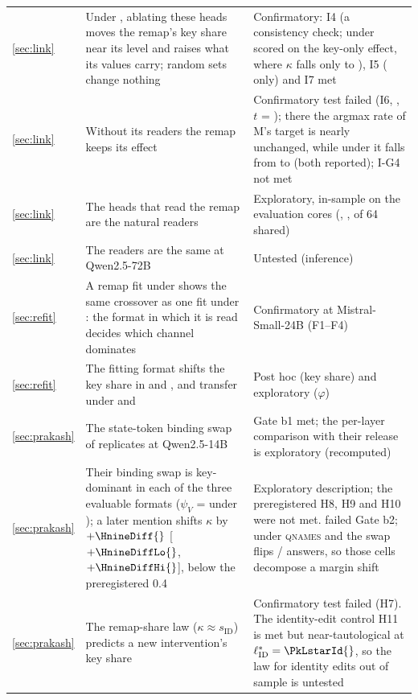 \begin{table}[p]
\begin{tabular}{p{}p{}p{}}
\cref{sec:link} & Under \fmtOpt{}, ablating these heads moves the remap's key share near its \fmtNone{} level and raises what its values carry; random sets change nothing & Confirmatory: I4 (a consistency check; under \fmtLetter{} scored on the key-only effect, where $\kappa$ falls only to \IfourKappaALetter{}), I5 (\fmtOpt{} only) and I7 met \\
\cref{sec:link} & Without its readers the remap keeps its effect & Confirmatory test failed (I6, \fmtOpt{}, $t$ = \IsixT{}); there the argmax rate of M's target is nearly unchanged, while under \fmtLetter{} it falls from \IsixMTLetter{} to \IsixMTALetter{} (both reported); I-G4 not met \\
\cref{sec:link} & The heads that read the remap are the natural readers & Exploratory, in-sample on the evaluation cores (\IremOverlapOpt{}, \IremOverlapLetter{}, \IremOverlapPost{} of 64 shared) \\
\cref{sec:link} & The readers are the same at Qwen2.5-72B & Untested (inference) \\
\cref{sec:refit} & A remap fit under \fmtNone{} shows the same crossover as one fit under \fmtOpt{}: the format in which it is read decides which channel dominates & Confirmatory at Mistral-Small-24B (F1--F4) \\
\cref{sec:refit} & The fitting format shifts the key share in \fmtOpt{} and \fmtPost{}, and transfer under \fmtNone{} and \fmtLetter{} & Post hoc (key share) and exploratory ($\varphi$) \\
\cref{sec:prakash} & The state-token binding swap of \citet{prakash2025lookbacks} replicates at Qwen2.5-14B & Gate b1 met; the per-layer comparison with their release is exploratory (recomputed) \\
\cref{sec:prakash} & Their binding swap is key-dominant in each of the three evaluable formats ($\psi_V$ = \PkPsiVBindNone{} under \fmtNone{}); a later mention shifts $\kappa$ by $+\HnineDiff{}$ [$+\HnineDiffLo{}$, $+\HnineDiffHi{}$], below the preregistered 0.4 & Exploratory description; the preregistered H8, H9 and H10 were not met. \fmtLetter{} failed Gate b2; under \textsc{qnames} and \fmtOpt{} the swap flips \PkNflipBindQnames{}/\PkN{} answers, so those cells decompose a margin shift \\
\cref{sec:prakash} & The remap-share law ($\kappa \approx s_{\mathrm{ID}}$) predicts a new intervention's key share & Confirmatory test failed (H7). The identity-edit control H11 is met but near-tautological at $\ell^*_{\mathrm{ID}} = \PkLstarId{}$, so the law for identity edits out of sample is untested \\

\end{tabular}
\end{table}
